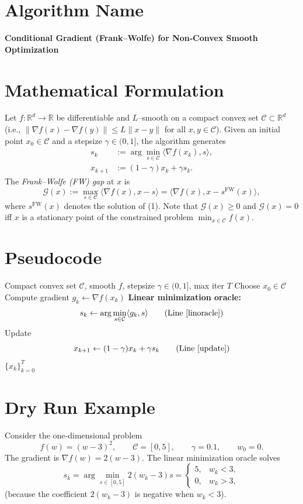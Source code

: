 \documentclass{article}
\newcommand{\R}{\mathbb{R}}
\newcommand{\Cset}{\mathcal{C}}
\newcommand{\grad}{\nabla}
\newcommand{\gap}{\mathcal{G}}
\newcommand{\inner}[2]{\langle #1,#2\rangle}
\begin{document}
\section*{Algorithm Name}
\textbf{Conditional Gradient (Frank–Wolfe) for Non‑Convex Smooth Optimization}

\section*{Mathematical Formulation}
Let $f:\R^{d}\rightarrow\R$ be differentiable and $L$–smooth on a compact convex set 
$\Cset\subset\R^{d}$ (i.e., $\| \grad f(x)-\grad f(y)\|\le L\|x-y\|$ for all $x,y\in\Cset$).
Given an initial point $x_{0}\in\Cset$ and a stepsize $\gamma\in(0,1]$, the algorithm generates
\[
\begin{aligned}
s_{k} &:= \arg\min_{s\in\Cset}\inner{\grad f(x_{k})}{s}, \tag{1}\\
x_{k+1} &:= (1-\gamma)x_{k}+\gamma s_{k}. \tag{2}
\end{aligned}
\]
The \emph{Frank–Wolfe (FW) gap} at $x$ is
\[
\gap(x):=\max_{s\in\Cset}\inner{\grad f(x)}{x-s}
          =\inner{\grad f(x)}{x-s^{\mathrm{FW}}(x)},
\]
where $s^{\mathrm{FW}}(x)$ denotes the solution of (1).  Note that $\gap(x)\ge0$ and
$\gap(x)=0$ iff $x$ is a stationary point of the constrained problem
$\min_{x\in\Cset}f(x)$.

\section*{Pseudocode}
\begin{algorithm}[H]
\caption{Conditional Gradient (Frank–Wolfe) for Non‑Convex $f$}
\begin{algorithmic}[1]
\Require Compact convex set $\Cset$, smooth $f$, stepsize $\gamma\in(0,1]$, max iter $T$
\State Choose $x_{0}\in\Cset$
    \State Compute gradient $g_{k}\gets\grad f(x_{k})$
    \State \textbf{Linear minimization oracle:}
          \[
          s_{k}\gets\arg\min_{s\in\Cset}\inner{g_{k}}{s}
          \tag{Line~\ref{linoracle}}
          \]
    \State Update 
          \[
          x_{k+1}\gets (1-\gamma)x_{k}+\gamma s_{k}
          \tag{Line~\ref{update}}
          \]
\EndFor
\State \Return $\{x_{k}\}_{k=0}^{T}$
\end{algorithmic}
\end{algorithm}

\section*{Dry Run Example}
Consider the one‑dimensional problem
\[
f(w)=(w-3)^{2},\qquad \Cset=[0,5],\qquad \gamma=0.1,\qquad w_{0}=0.
\]
The gradient is $\grad f(w)=2(w-3)$.  The linear minimization oracle solves
\[
s_{k}=\arg\min_{s\in[0,5]} 2(w_{k}-3)s=
\begin{cases}
5,& w_{k}<3,\\
0,& w_{k}>3,
\end{cases}
\]
(because the coefficient $2(w_{k}-3)$ is negative when $w_{k}<3$).
\end{document}
